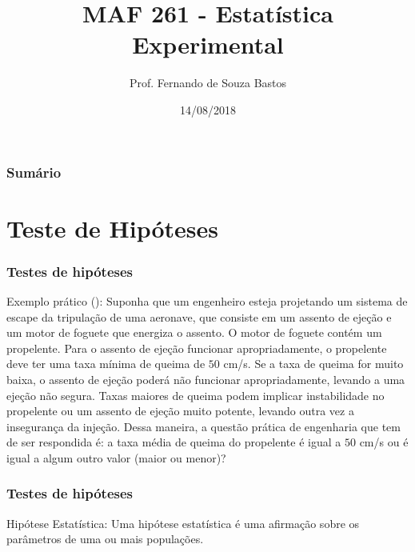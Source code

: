 \documentclass[14pt,aspectratio=1610]{beamer}
\title{MAF 261 - Estatística Experimental}
\author{Prof. Fernando de Souza Bastos}
\institute{Instituto de Ciências Exatas e Tecnológicas\texorpdfstring{\\ Universidade Federal de Viçosa}{}\texorpdfstring{\\ Campus UFV - Florestal}{}}
\date{14/08/2018}
\begin{document}


\frame{\titlepage}

\begin{frame}{}
\frametitle{\bf Sumário}
\tableofcontents
\end{frame}

\section{Teste de Hipóteses}
\begin{frame}{}
\frametitle{Testes de hipóteses}
\begin{block}{Exemplo prático (\cite{montgomery2016}):}
\justifying
Suponha que um engenheiro esteja projetando um sistema de escape da tripulação de uma aeronave, que consiste em um assento de ejeção e um motor de foguete 
que energiza o assento. O motor de foguete contém um propelente. Para o assento de ejeção funcionar apropriadamente, o propelente deve ter uma taxa mínima de 
queima de $50$ cm/s. Se a taxa de queima for muito baixa, o assento de ejeção poderá não funcionar apropriadamente, levando a uma ejeção não segura. Taxas maiores 
de queima podem implicar instabilidade no propelente ou um assento de ejeção muito potente, levando outra vez a insegurança da injeção. Dessa maneira, a questão 
prática de engenharia que tem de ser respondida é: a taxa média de queima do propelente é igual a $50$ cm/s ou é igual a algum outro valor 
(maior ou menor)?
\end{block}
\end{frame}

\begin{frame}{}
\frametitle{Testes de hipóteses}
\begin{block}{Hipótese Estatística:}
Uma hipótese estatística é uma afirmação sobre os parâmetros de uma ou mais populações.
 \end{block}
\end{frame}
\end{document}
